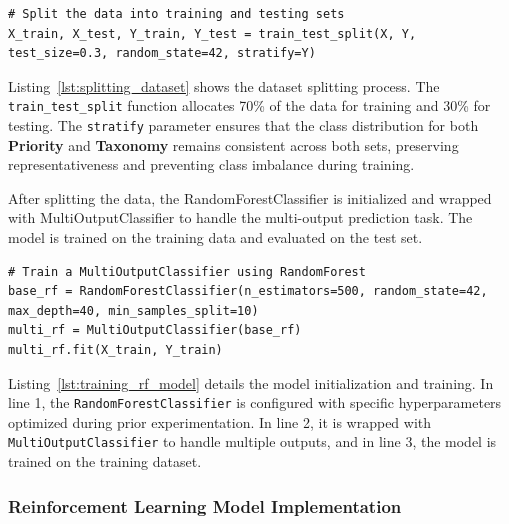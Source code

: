 \vspace{0.2cm}
\noindent
\begin{minipage}{\linewidth}
\begin{verbatim}
# Split the data into training and testing sets
X_train, X_test, Y_train, Y_test = train_test_split(X, Y, test_size=0.3, random_state=42, stratify=Y)
\end{verbatim}
\label{lst:splitting_dataset}
\end{minipage}
\vspace{0.1cm}

Listing~\ref{lst:splitting_dataset} shows the dataset splitting process. 
The \texttt{train\_test\_split} function allocates 70\% of the data for training and 30\% for testing. 
The \texttt{stratify} parameter ensures that the class distribution for both \textbf{Priority} and \textbf{Taxonomy} remains consistent across both sets, preserving representativeness and preventing class imbalance during training.

After splitting the data, the RandomForestClassifier is initialized and wrapped with MultiOutputClassifier to handle the multi-output prediction task. 
The model is trained on the training data and evaluated on the test set. 

\vspace{0.2cm}
\noindent
\begin{minipage}{\linewidth}
\begin{verbatim}
# Train a MultiOutputClassifier using RandomForest
base_rf = RandomForestClassifier(n_estimators=500, random_state=42, max_depth=40, min_samples_split=10)
multi_rf = MultiOutputClassifier(base_rf)
multi_rf.fit(X_train, Y_train)
\end{verbatim}
\label{lst:training_rf_model}
\end{minipage}
\vspace{0.1cm}

Listing~\ref{lst:training_rf_model} details the model initialization and training. 
In line 1, the \texttt{RandomForestClassifier} is configured with specific hyperparameters optimized during prior experimentation. 
In line 2, it is wrapped with \texttt{MultiOutputClassifier} to handle multiple outputs, and in line 3, the model is trained on the training dataset.

\subsubsection{Reinforcement Learning Model Implementation}

